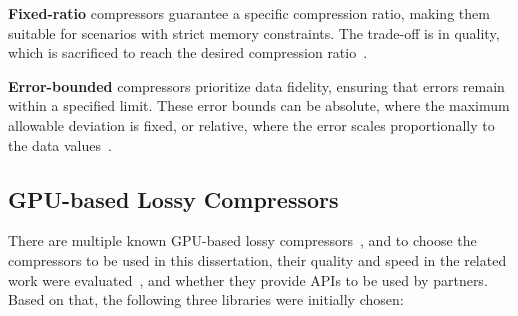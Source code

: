 \documentclass[Ingles]{ic-tese-v3}
\begin{document}
\textbf{Fixed-ratio} compressors guarantee a specific compression ratio, making them suitable for scenarios with strict memory constraints. The trade-off is in quality, which is sacrificed to reach the desired compression ratio~\cite{di2025}. 

\textbf{Error-bounded} compressors prioritize data fidelity, ensuring that \compression errors remain within a specified limit. These error bounds can be absolute, where the maximum allowable deviation is fixed, or relative, where the error scales proportionally to the data values~\cite{di2025}.

\subsection{GPU-based Lossy Compressors}
\label{sec:gpubased_lossy}

There are multiple known GPU-based lossy compressors~\cite{di2025}, and to choose the compressors to be used in this dissertation, their quality and speed in the related work were evaluated~\cite{dmitriev2022,kukreja2020,shen2022,shen2023,barbosa2023}, and whether they provide APIs to be used by partners. Based on that, the following three libraries were initially chosen:
\end{document}
